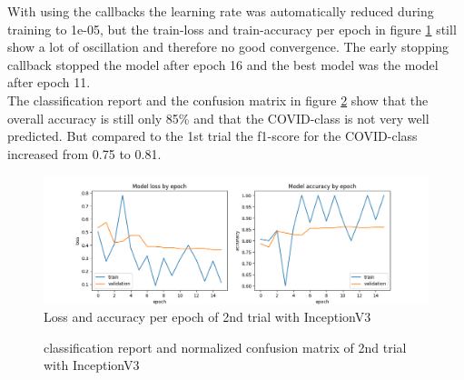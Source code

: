 \documentclass{article}
\begin{document}
With using the callbacks the learning rate was automatically reduced during training to 1e-05, but the train-loss and train-accuracy per epoch in figure \ref{fig:inceptionv3_05_loss_accuracy} still show a lot of oscillation and therefore no good convergence. The early stopping callback stopped the model after epoch 16 and the best model was the model after epoch 11.\\
The classification report and the confusion matrix in figure \ref{fig:inceptionv3_05_results} show that the overall accuracy is still only 85\% and that the COVID-class is not very well predicted. But compared to the 1st trial the f1-score for the COVID-class increased from 0.75 to 0.81.

\begin{figure}[htb] %
    \centering
    \includegraphics[width=1.0\linewidth]{inceptionv3_05_loss_accuracy.png}
    \caption{Loss and accuracy per epoch of 2nd trial with InceptionV3}
    \label{fig:inceptionv3_05_loss_accuracy}
\end{figure}

\begin{figure}[!h]
  \centering
  \qquad
  \caption{classification report and normalized confusion matrix of 2nd trial with InceptionV3}
  \label{fig:inceptionv3_05_results}
\end{figure}
\end{document}
